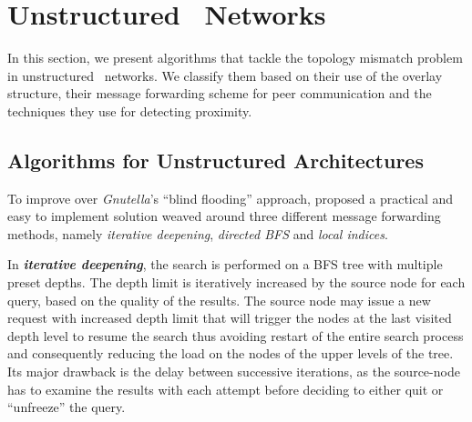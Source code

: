 \section{Unstructured \p\ Networks}
\label{section:unstructured}

In this section, we present algorithms that tackle the topology mismatch
problem in unstructured \p\ networks. We classify them based on their
use of the overlay structure, their message forwarding scheme 
for peer communication and the techniques they use for detecting
proximity.

\subsection{Algorithms for Unstructured Architectures}





To improve over \emph{Gnutella}'s ``blind flooding'' approach,
\cite{YG-M2002} proposed a practical and easy to implement solution 
weaved around three different message forwarding methods, namely
\emph{iterative deepening}, \emph{directed BFS} and \emph{local indices}.

In \textbf{\emph{iterative deepening}},
the search is
performed on a BFS tree with multiple preset depths. 
The depth limit is iteratively increased by the source node for each query, 
based on the quality of the results. 
The source node may issue a new request with increased depth limit
that will trigger the nodes at the last visited depth level to resume the
search thus avoiding restart of the entire search process and consequently 
reducing the load on the nodes of the upper levels of the tree. 
Its major drawback is the delay between successive iterations, as the
source-node has to examine the results with each attempt before deciding to
either quit or ``unfreeze'' the query.

